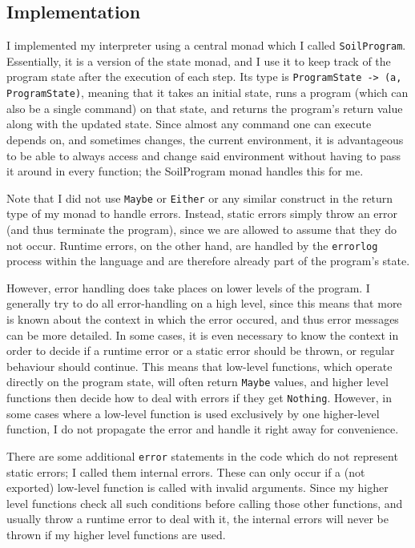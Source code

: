 \documentclass[a4paper]{article}
\begin{document}
\subsection*{Implementation}
I implemented my interpreter using a central monad which I called \texttt{SoilProgram}. Essentially, it is a version of the state monad, and I use it to keep track of the program state after the execution of each step. Its type is \texttt{ProgramState -> (a, ProgramState)}, meaning that it takes an initial state, runs a program (which can also be a single command) on that state, and returns the program's return value along with the updated state. Since almost any command one can execute depends on, and sometimes changes, the current environment, it is advantageous to be able to always access and change said environment without having to pass it around in every function; the SoilProgram monad handles this for me.

Note that I did not use \texttt{Maybe} or \texttt{Either} or any similar construct in the return type of my monad to handle errors. Instead, static errors simply throw an error (and thus terminate the program), since we are allowed to assume that they do not occur. Runtime errors, on the other hand, are handled by the \texttt{errorlog} process within the language and are therefore already part of the program's state.

However, error handling does take places on lower levels of the program. I generally try to do all error-handling on a high level, since this means that more is known about the context in which the error occured, and thus error messages can be more detailed. In some cases, it is even necessary to know the context in order to decide if a runtime error or a static error should be thrown, or regular behaviour should continue. This means that low-level functions, which operate directly on the program state, will often return \texttt{Maybe} values, and higher level functions then decide how to deal with errors if they get \texttt{Nothing}. However, in some cases where a low-level function is used exclusively by one higher-level function, I do not propagate the error and handle it right away for convenience.

There are some additional \texttt{error} statements in the code which do not represent static errors; I called them internal errors. These can only occur if a (not exported) low-level function is called with invalid arguments. Since my higher level functions check all such conditions before calling those other functions, and usually throw a runtime error to deal with it, the internal errors will never be thrown if my higher level functions are used. 
\end{document}
